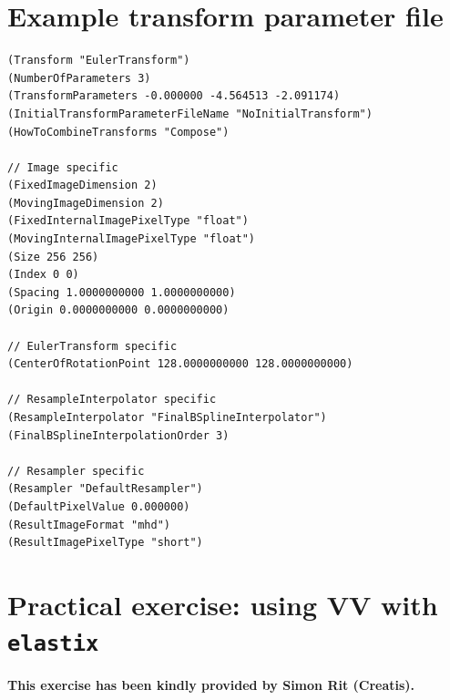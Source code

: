 \documentclass[]{report}
\newcommand{\elastix}{\texttt{elastix}}
\begin{document}

\chapter{Example transform parameter file}\label{chp:ExampleTransformParam}

\small
\begin{verbatim}
(Transform "EulerTransform")
(NumberOfParameters 3)
(TransformParameters -0.000000 -4.564513 -2.091174)
(InitialTransformParameterFileName "NoInitialTransform")
(HowToCombineTransforms "Compose")

// Image specific
(FixedImageDimension 2)
(MovingImageDimension 2)
(FixedInternalImagePixelType "float")
(MovingInternalImagePixelType "float")
(Size 256 256)
(Index 0 0)
(Spacing 1.0000000000 1.0000000000)
(Origin 0.0000000000 0.0000000000)

// EulerTransform specific
(CenterOfRotationPoint 128.0000000000 128.0000000000)

// ResampleInterpolator specific
(ResampleInterpolator "FinalBSplineInterpolator")
(FinalBSplineInterpolationOrder 3)

// Resampler specific
(Resampler "DefaultResampler")
(DefaultPixelValue 0.000000)
(ResultImageFormat "mhd")
(ResultImagePixelType "short")
\end{verbatim}
\normalsize

\chapter{Practical exercise: using VV with \elastix}\label{chp:vvtutorial}

\textbf{This exercise has been kindly provided by Simon Rit (Creatis).}
\end{document}
